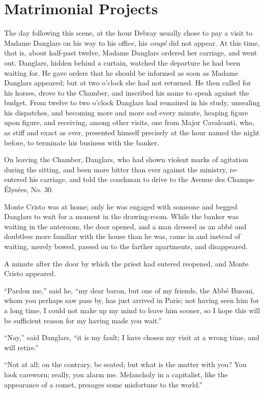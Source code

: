 \chapter{Matrimonial Projects}

The day following this scene, at the hour Debray usually chose to pay a
visit to Madame Danglars on his way to his office, his \textit{coupé} did not
appear. At this time, that is, about half-past twelve, Madame Danglars
ordered her carriage, and went out. Danglars, hidden behind a curtain,
watched the departure he had been waiting for. He gave orders that he
should be informed as soon as Madame Danglars appeared; but at two
o’clock she had not returned. He then called for his horses, drove to
the Chamber, and inscribed his name to speak against the budget. From
twelve to two o’clock Danglars had remained in his study, unsealing his
dispatches, and becoming more and more sad every minute, heaping figure
upon figure, and receiving, among other visits, one from Major
Cavalcanti, who, as stiff and exact as ever, presented himself
precisely at the hour named the night before, to terminate his business
with the banker.

On leaving the Chamber, Danglars, who had shown violent marks of
agitation during the sitting, and been more bitter than ever against
the ministry, re-entered his carriage, and told the coachman to drive
to the Avenue des Champs-Élysées, No. 30.

Monte Cristo was at home; only he was engaged with someone and begged
Danglars to wait for a moment in the drawing-room. While the banker was
waiting in the anteroom, the door opened, and a man dressed as an abbé
and doubtless more familiar with the house than he was, came in and
instead of waiting, merely bowed, passed on to the farther apartments,
and disappeared.

A minute after the door by which the priest had entered reopened, and
Monte Cristo appeared.

“Pardon me,” said he, “my dear baron, but one of my friends, the Abbé
Busoni, whom you perhaps saw pass by, has just arrived in Paris; not
having seen him for a long time, I could not make up my mind to leave
him sooner, so I hope this will be sufficient reason for my having made
you wait.”

“Nay,” said Danglars, “it is my fault; I have chosen my visit at a
wrong time, and will retire.”

“Not at all; on the contrary, be seated; but what is the matter with
you? You look careworn; really, you alarm me. Melancholy in a
capitalist, like the appearance of a comet, presages some misfortune to
the world.”

